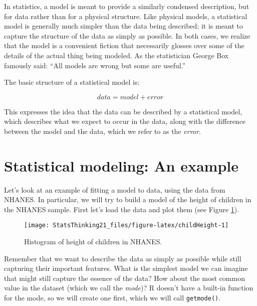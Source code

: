 \documentclass[]{book}
\newenvironment{Shaded}{\begin{snugshade}}{\end{snugshade}}
\newcommand{\KeywordTok}[1]{\textcolor[rgb]{0.13,0.29,0.53}{\textbf{#1}}}
\newcommand{\StringTok}[1]{\textcolor[rgb]{0.31,0.60,0.02}{#1}}
\newcommand{\CommentTok}[1]{\textcolor[rgb]{0.56,0.35,0.01}{\textit{#1}}}
\newcommand{\ControlFlowTok}[1]{\textcolor[rgb]{0.13,0.29,0.53}{\textbf{#1}}}
\newcommand{\OperatorTok}[1]{\textcolor[rgb]{0.81,0.36,0.00}{\textbf{#1}}}
\newcommand{\NormalTok}[1]{#1}
\theoremstyle{definition}
\theoremstyle{definition}
\theoremstyle{definition}
\theoremstyle{remark}
\begin{document}
In statistics, a model is meant to provide a similarly condensed
description, but for data rather than for a physical structure. Like
physical models, a statistical model is generally much simpler than the
data being described; it is meant to capture the structure of the data
as simply as possible. In both cases, we realize that the model is a
convenient fiction that necessarily glosses over some of the details of
the actual thing being modeled. As the statistician George Box famously
said: ``All models are wrong but some are useful.''

The basic structure of a statistical model is:

\[
data = model + error
\]

This expresses the idea that the data can be described by a statistical
model, which describes what we expect to occur in the data, along with
the difference between the model and the data, which we refer to as the
\emph{error}.

\section{Statistical modeling: An
example}\label{statistical-modeling-an-example}

Let's look at an example of fitting a model to data, using the data from
NHANES. In particular, we will try to build a model of the height of
children in the NHANES sample. First let's load the data and plot them
(see Figure \ref{fig:childHeight}).

\begin{figure}
\texttt{[image: StatsThinking21\_files/figure-latex/childHeight-1]} \caption{Histogram of height of children in NHANES.}\label{fig:childHeight}
\end{figure}

Remember that we want to describe the data as simply as possible while
still capturing their important features. What is the simplest model we
can imagine that might still capture the essence of the data? How about
the most common value in the dataset (which we call the \emph{mode})? R
doesn't have a built-in function for the mode, so we will create one
first, which we will call \texttt{getmode()}.

\begin{Shaded}
\end{Shaded}
\end{document}
